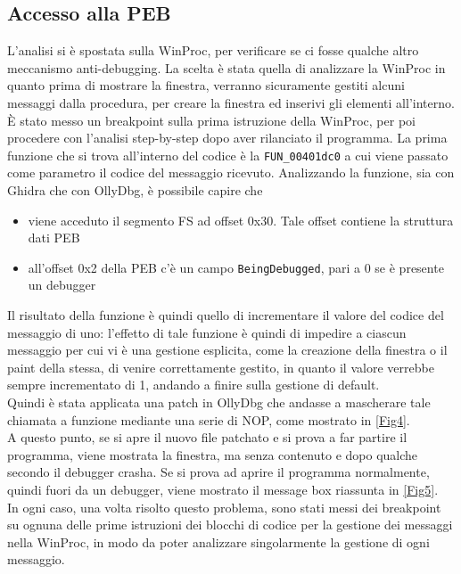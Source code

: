 \documentclass{article}
\begin{document}
\subsection{Accesso alla PEB}
L'analisi si è spostata sulla WinProc, per verificare se ci fosse qualche altro meccanismo anti-debugging. La scelta è stata quella di analizzare la WinProc in quanto prima di mostrare la finestra, verranno sicuramente gestiti alcuni messaggi dalla procedura, per creare la finestra ed inserivi gli elementi all'interno.\\È stato messo un breakpoint sulla prima istruzione della WinProc, per poi procedere con l'analisi step-by-step dopo aver rilanciato il programma. La prima funzione che si trova all'interno del codice è la \texttt{FUN\_00401dc0} a cui viene passato come parametro il codice del messaggio ricevuto. Analizzando la funzione, sia con Ghidra che con OllyDbg, è possibile capire che
\begin{itemize}
\item viene acceduto il segmento FS ad offset 0x30. Tale offset contiene la struttura dati PEB
\item all'offset 0x2 della PEB c'è un campo \texttt{BeingDebugged}, pari a 0 se è presente un debugger
\end{itemize}
Il risultato della funzione è quindi quello di incrementare il valore del codice del messaggio di uno: l'effetto di tale funzione è quindi di impedire a ciascun messaggio per cui vi è una gestione esplicita, come la creazione della finestra o il paint della stessa, di venire correttamente gestito, in quanto il valore verrebbe sempre incrementato di 1, andando a finire sulla gestione di default.\\Quindi è stata applicata una patch in OllyDbg che andasse a mascherare tale chiamata a funzione mediante una serie di NOP, come mostrato in \ref{Fig4}.\\A questo punto, se si apre il nuovo file patchato e si prova a far partire il programma, viene mostrata la finestra, ma senza contenuto e dopo qualche secondo il debugger crasha. Se si prova ad aprire il programma normalmente, quindi fuori da un debugger, viene mostrato il message box riassunta in \ref{Fig5}.\\In ogni caso, una volta risolto questo problema, sono stati messi dei breakpoint su ognuna delle prime istruzioni dei blocchi di codice per la gestione dei messaggi nella WinProc, in modo da poter analizzare singolarmente la gestione di ogni messaggio. 
\end{document}
